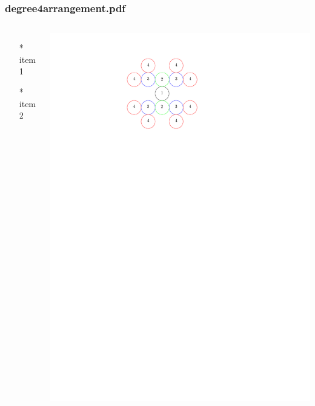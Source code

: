 \begin{frame} \frametitle{degree4arrangement.pdf}
    \begin{columns}[c]
        \begin{itemize}
            \item[*] item 1
            \item[*] item 2
        \end{itemize}
        \begin{minipage}{\linewidth}
            \begin{center}
            \includegraphics[width=.9\textwidth]{graphics/degree4arrangement.pdf}
            \label{gfx:degree4arrangement.pdf}
            \end{center}
        \end{minipage}
    \end{columns}
\end{frame}
